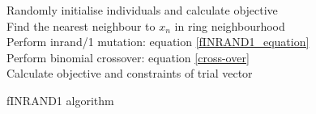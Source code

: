 \begin{algorithm}[!ht]
\SetAlgoNoLine
 Randomly initialise individuals and calculate objective\\
 {
  {
  Find the nearest neighbour to $x_n$ in ring neighbourhood\\
  Perform inrand/1 mutation: equation \ref{fINRAND1_equation}\\
  Perform binomial crossover: equation \ref{cross-over}\\
  Calculate objective and constraints of trial vector
  }
 }
 \caption{fINRAND1 algorithm}
 \label{fINRAND1 algorithm}
\end{algorithm}